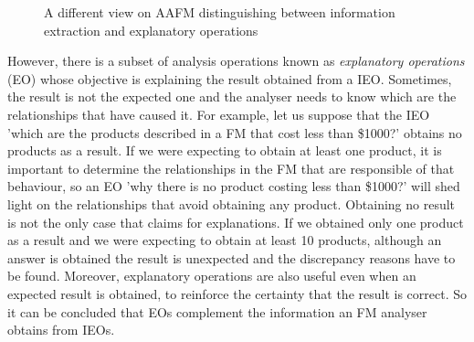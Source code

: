\begin{figure}[htb]
	\centering
		
	\caption{A different view on AAFM distinguishing between information extraction and explanatory operations}
	\label{fig:AAFM}
\end{figure}

However, there is a subset of analysis operations known as \emph{explanatory operations} (EO) whose objective is explaining the result obtained from a IEO. Sometimes, the result is not the expected one and the analyser needs to know which are the relationships that have caused it. For example, let us suppose that the IEO 'which are the products described in a FM that cost less than \$1000?' obtains no products as a result. If we were expecting to obtain at least one product, it is important to determine the relationships in the FM that are responsible of that behaviour, so an EO 'why there is no product costing less than \$1000?' will shed light on the relationships that avoid obtaining any product. Obtaining no result is not the only case that claims for explanations. If we obtained only one product as a result and we were expecting to obtain at least 10 products, although an answer is obtained the result is unexpected and the discrepancy reasons have to be found. Moreover, explanatory operations are also useful even when an expected result is obtained, to reinforce the certainty that the result is correct. So it can be concluded that EOs complement the information an FM analyser obtains from IEOs.

